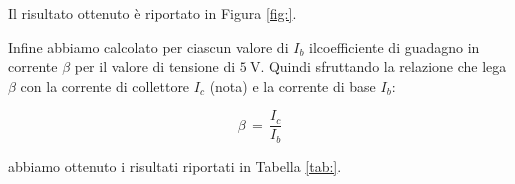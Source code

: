 Il risultato ottenuto è riportato in Figura \ref{fig:}.

Infine abbiamo calcolato per ciascun valore di $I_b$ ilcoefficiente di guadagno in corrente $\beta$ per il valore di tensione di $\SI{5}{\volt}$. Quindi sfruttando la relazione che lega $\beta$ con la corrente di collettore $I_c$ (nota) e la corrente di base $I_b$:

\begin{equation}
	\beta \,=\, \frac{I_c}{I_b}
\end{equation}

abbiamo ottenuto i risultati riportati in Tabella \ref{tab:}.